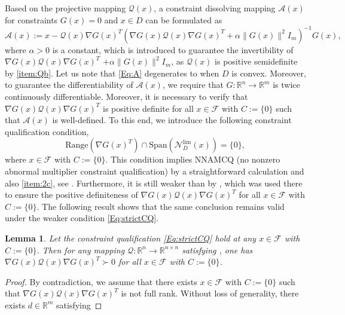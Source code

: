 \documentclass[11pt,a4paper,reqno]{amsart}
\newtheorem{lemma}[theorem]{Lemma}
\begin{document}
{Based on the projective mapping $\mathcal Q(x)$, a constraint dissolving mapping $\mathcal A(x)$ for constraints $G(x)=0$ and $x\in D$ can be formulated as
\begin{equation}\label{Eq:A}
    \mathcal A(x):=x-\mathcal Q(x)\nabla G(x)^T \left( \nabla G(x)\mathcal Q(x)\nabla G(x)^T+\alpha \| G(x)\|^2 I_m\right)^{-1} G(x),
\end{equation}
where $\alpha>0$ is a constant, which is introduced to guarantee the invertibility of $ \nabla G(x)\mathcal Q(x)\nabla G(x)^T$ $+\alpha \| G(x)\|^2 I_m$, as $\mathcal Q(x)$ is positive semidefinite by  \ref{item:Qb}. Let us note that \eqref{Eq:A} degenerates to \cite[(4.2)]{xiao2026exact} when $D$ is convex. Moreover, to guarantee the differentiability of $\mathcal A(x)$, we require that $G:\mathbb R^n \to \mathbb R^m$ is twice continuously differentiable. Moreover, it is necessary to verify that $\nabla G(x)\mathcal Q(x)\nabla G(x)^T$ is positive definite for all $x\in \mathcal F$ with $C:=\{0\}$ such that $\mathcal A(x)$ is well-defined. To this end, we introduce the following constraint qualification condition,
\begin{equation}\label{Eq:strictCQ}
     \text{Range}\left(\nabla G(x)^T\right) \cap \text{Span} \left(\mathcal N_D^{\text{lim}}(x)\right)=\{0\},
\end{equation}
where $x\in \mathcal F$ with $C:=\{0\}$. This condition implies NNAMCQ (no nonzero abnormal multiplier constraint qualification) by a straightforward calculation and also  \ref{item:2c}, see \cite[Section~5.1]{mehlitz2020asymptotic}. Furthermore, it is still weaker than \cite[Assumption~1.1 (2b)]{xiao2026exact} by \cite[Lemma~2.2]{xiao2026exact}, which was used there to ensure the positive definiteness of  $\nabla G(x)\mathcal Q(x)\nabla G(x)^T$ for all $x\in \mathcal F$ with $C:=\{0\}$. The following result shows that the same conclusion remains valid under the weaker condition \eqref{Eq:strictCQ}.
\begin{lemma}\label{Lem:Q}
     Let the constraint qualification \eqref{Eq:strictCQ} hold at any $x\in \mathcal F$ with $C:=\{0\}$. Then for any mapping $\mathcal Q:\mathbb R^n\to \mathbb R^{n \times n}$ satisfying , one has $\nabla G(x)\mathcal Q(x)\nabla G(x)^T \succ 0$ for all $x\in \mathcal F$ with $C:=\{0\}$.
\end{lemma}
\begin{proof}
    By contradiction, we assume that there exists $x\in \mathcal F$ with $C:=\{0\}$ such that $\nabla G(x)\mathcal Q(x)\nabla G(x)^T$ is not full rank. Without loss of generality, there exists $d\in \mathbb R^m$ satisfying

\end{proof}}
\end{document}
